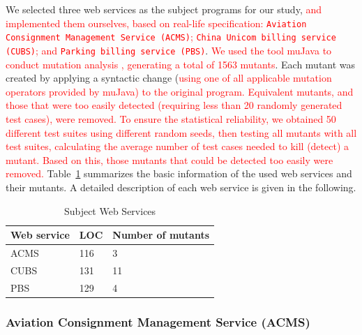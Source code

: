 \documentclass[10pt,journal,compsoc]{IEEEtran}
\begin{document}
We selected three web services as the subject programs for our study, \textcolor{red}{and implemented them ourselves, based on real-life specification:
\texttt{Aviation Consignment Management Service (ACMS)};
\texttt{China Unicom billing service (CUBS)}; and
\texttt{Parking billing service (PBS)}}. \textcolor{red}{
We used the tool muJava \cite{ma2005mujava} to conduct mutation analysis \cite{demillo1978hints, chen2018test, mao2017out, chen2017similarity}, generating a total of 1563 mutants}. Each mutant was created by applying a syntactic change (\textcolor{red}{using one of all applicable mutation operators provided by muJava) to the original program. Equivalent mutants, and those that were too easily detected}
\textcolor{red}{(requiring less than 20 randomly generated test cases), were removed.}
\textcolor{red}{To ensure the statistical reliability, we obtained 50 different test suites using different random seeds, then testing all mutants with all test suites, calculating the average number of test cases needed to kill (detect) a mutant. Based on this, those mutants that could be detected too easily were removed.} Table~\ref{tab:objects} summarizes the basic information of the used web services and their mutants.
A detailed description of each web service is given in the following.

\begin{table}[h]
\caption{Subject Web Services}
\label{tab:objects}
\centering
\begin{tabular}{lll} \toprule
  Web service                            &LOC                            &Number of mutants    \\ \midrule
  ACMS                                   &116                            &3                                    \\
  CUBS                                   &131                            &11                                  \\
  PBS                                    &129                            &4                                   \\ \bottomrule
\end{tabular}

\end{table}

\subsubsection{Aviation Consignment Management Service (ACMS)}
\label{sec:acms}
\end{document}
